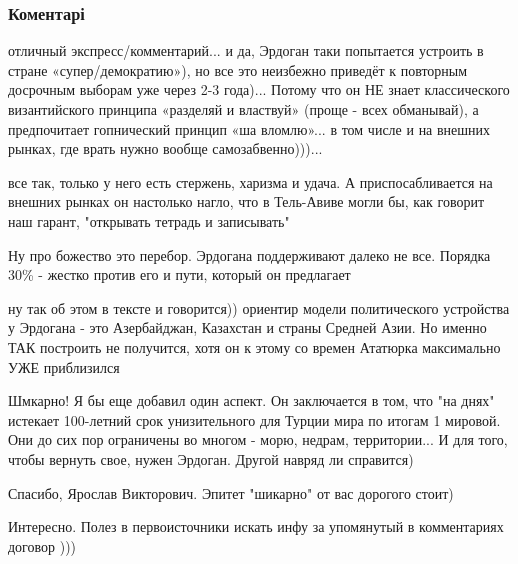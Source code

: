  
 
 
 
 
\subsubsection{Коментарі}

\begin{itemize} %

отличный экспресс/комментарий... и да, Эрдоган таки попытается устроить в
стране «супер/демократию»), но все это неизбежно приведёт к повторным досрочным
выборам уже через 2-3 года)... Потому что он НЕ знает классического
византийского принципа «разделяй и властвуй» (проще - всех обманывай), а
предпочитает гопнический принцип «ша вломлю»... в том числе и на внешних
рынках, где врать нужно вообще самозабвенно)))...


все так, только у него есть стержень, харизма и удача. А приспосабливается на
внешних рынках он настолько нагло, что в Тель-Авиве могли бы, как говорит наш
гарант, "открывать тетрадь и записывать"

Ну про божество это перебор. Эрдогана поддерживают далеко не все. Порядка 30\% - жестко против его и пути, который он предлагает

ну так об этом в тексте и говорится)) ориентир модели политического устройства у Эрдогана - это Азербайджан, Казахстан и страны Средней Азии. Но именно ТАК построить не получится, хотя он к этому со времен Ататюрка максимально УЖЕ приблизился


Шмкарно! Я бы еще добавил один аспект. Он заключается в том, что "на днях"
истекает 100-летний срок унизительного для Турции мира по итогам 1 мировой. Они
до сих пор ограничены во многом - морю, недрам, территории... И для того, чтобы
вернуть свое, нужен Эрдоган. Другой навряд ли справится)


Спасибо, Ярослав Викторович. Эпитет "шикарно" от вас дорогого стоит)

Интересно. Полез в первоисточники искать инфу за упомянутый в комментариях договор )))


\end{itemize}
